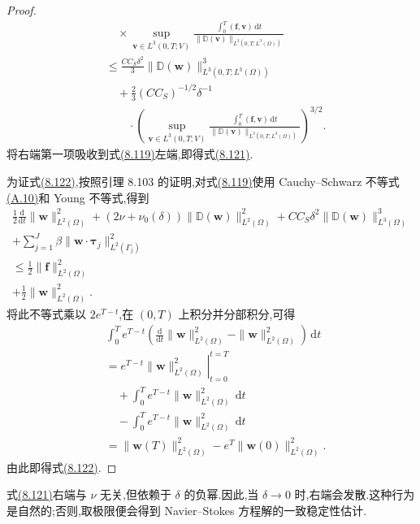 \begin{lemma}[对 $\nu$ 一致的稳定性估计]
\begin{proof}
\[\begin{aligned}
 &\quad\times\sup_{\bm{v}\in L^3(0,T;V)}
   \frac{\int_0^T(\bm{f},\bm{v})\,\mathrm{d}t}
        {\|\mathbb{D}(\bm{v})\|_{L^3(0,T;L^3(\Omega))}}\\
 &\le \frac{C C_S\delta^2}{3}
       \|\mathbb{D}(\bm{w})\|_{L^3(0,T;L^3(\Omega))}^3\\
 &\quad+\frac23(CC_S)^{-1/2}\delta^{-1}\\
 &\qquad\cdot\left(\sup_{\bm{v}\in L^3(0,T;V)}
   \frac{\int_0^T(\bm{f},\bm{v})\,\mathrm{d}t}
        {\|\mathbb{D}(\bm{v})\|_{L^3(0,T;L^3(\Omega))}}\right)^{3/2}.
\end{aligned}
\]
将右端第一项吸收到式\hyperref[eq:smagorinsky-strain-energy-inequality]{(8.119)}左端,即得式\hyperref[eq:smagorinsky-uniform-stability]{(8.121)}.

为证式\hyperref[eq:smagorinsky-weighted-stability]{(8.122)},按照引理 8.103 的证明,对式\hyperref[eq:smagorinsky-strain-energy-inequality]{(8.119)}使用 Cauchy--Schwarz 不等式\hyperref[eq:appendix-a-10]{(A.10)}和 Young 不等式,得到
\[
\begin{gathered}
 \frac12\frac{\mathrm{d}}{\mathrm{d}t}\|\bm{w}\|_{L^2(\Omega)}^2
 +(2\nu+\nu_0(\delta))\|\mathbb{D}(\bm{w})\|_{L^2(\Omega)}^2
 +C C_S\delta^2\|\mathbb{D}(\bm{w})\|_{L^3(\Omega)}^3\\
 +\sum_{j=1}^J\beta\|\bm{w}\cdot\symbf{\tau}_j\|_{L^2(\Gamma_j)}^2\\
 \le \frac12\|\bm{f}\|_{L^2(\Omega)}^2\\
       +\frac12\|\bm{w}\|_{L^2(\Omega)}^2.
\end{gathered}
\]
将此不等式乘以 $2e^{T-t}$,在 $(0,T)$ 上积分并分部积分,可得
\[
\begin{aligned}
 &\int_0^T e^{T-t}
   \left(\frac{\mathrm{d}}{\mathrm{d}t}\|\bm{w}\|_{L^2(\Omega)}^2
              -\|\bm{w}\|_{L^2(\Omega)}^2\right)\,\mathrm{d}t\\
  &=\left.e^{T-t}\|\bm{w}\|_{L^2(\Omega)}^2\right|_{t=0}^{t=T}\\
  &\quad+\int_0^T e^{T-t}\|\bm{w}\|_{L^2(\Omega)}^2\,\mathrm{d}t\\
  &\quad-\int_0^T e^{T-t}\|\bm{w}\|_{L^2(\Omega)}^2\,\mathrm{d}t\\
 &=\|\bm{w}(T)\|_{L^2(\Omega)}^2
      -e^T\|\bm{w}(0)\|_{L^2(\Omega)}^2.
\end{aligned}
\]
由此即得式\hyperref[eq:smagorinsky-weighted-stability]{(8.122)}.
\end{proof}
\end{lemma}

\begin{note}[关于稳定性估计(8.121)]
式\hyperref[eq:smagorinsky-uniform-stability]{(8.121)}右端与 $\nu$ 无关,但依赖于 $\delta$ 的负幂.因此,当 $\delta\to0$ 时,右端会发散.这种行为是自然的;否则,取极限便会得到 Navier--Stokes 方程解的一致稳定性估计.
\end{note}


